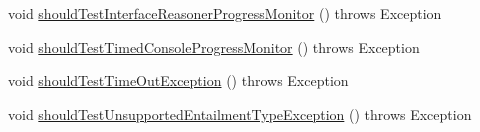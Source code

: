 \begin{DoxyCompactItemize}
\item 
void \hyperlink{classorg_1_1semanticweb_1_1owlapi_1_1contract_1_1_contract_reasoner_test_a94c2620840cbfb5bda617a7b89a4e336}{should\-Test\-Interface\-Reasoner\-Progress\-Monitor} ()  throws Exception 
\item 
void \hyperlink{classorg_1_1semanticweb_1_1owlapi_1_1contract_1_1_contract_reasoner_test_ad7b65531d382448353e51b79aad5d333}{should\-Test\-Timed\-Console\-Progress\-Monitor} ()  throws Exception 
\item 
void \hyperlink{classorg_1_1semanticweb_1_1owlapi_1_1contract_1_1_contract_reasoner_test_a963c51cd7c4284271acd3436e4ed23c4}{should\-Test\-Time\-Out\-Exception} ()  throws Exception 
\item 
void \hyperlink{classorg_1_1semanticweb_1_1owlapi_1_1contract_1_1_contract_reasoner_test_ab48aeafd3a2408d5c21cdc4c72a9d9dc}{should\-Test\-Unsupported\-Entailment\-Type\-Exception} ()  throws Exception 
\end{DoxyCompactItemize}


